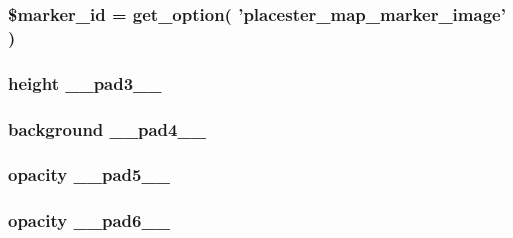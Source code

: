 \label{dc/d04/listings__map_8php_a85d5b478615ed4d6ab296cabe25e9ae4}
\hypertarget{listings__map_8php_ad29cb68cefe003634769eae00fd26916}{
\subsubsection[{\$marker\_\-id}]{\setlength{\rightskip}{0pt plus 5cm}\$marker\_\-id = get\_\-option( 'placester\_\-map\_\-marker\_\-image' )}}
\label{dc/d04/listings__map_8php_ad29cb68cefe003634769eae00fd26916}
\hypertarget{listings__map_8php_a2ea3cef4643b89d8260257f4d17eede9}{
\subsubsection[{\_\-\_\-pad3\_\-\_\-}]{\setlength{\rightskip}{0pt plus 5cm}height {\bf \_\-\_\-pad3\_\-\_\-}}}
\label{dc/d04/listings__map_8php_a2ea3cef4643b89d8260257f4d17eede9}
\hypertarget{listings__map_8php_a8278785471b941afcceb629250027091}{
\subsubsection[{\_\-\_\-pad4\_\-\_\-}]{\setlength{\rightskip}{0pt plus 5cm}background {\bf \_\-\_\-pad4\_\-\_\-}}}
\label{dc/d04/listings__map_8php_a8278785471b941afcceb629250027091}
\hypertarget{listings__map_8php_aa6b385de9b816c43892787e4b74c6f46}{
\subsubsection[{\_\-\_\-pad5\_\-\_\-}]{\setlength{\rightskip}{0pt plus 5cm}opacity {\bf \_\-\_\-pad5\_\-\_\-}}}
\label{dc/d04/listings__map_8php_aa6b385de9b816c43892787e4b74c6f46}
\hypertarget{listings__map_8php_af4b5cf450fa285756c93d9a01be423a7}{
\subsubsection[{\_\-\_\-pad6\_\-\_\-}]{\setlength{\rightskip}{0pt plus 5cm}opacity {\bf \_\-\_\-pad6\_\-\_\-}}}
